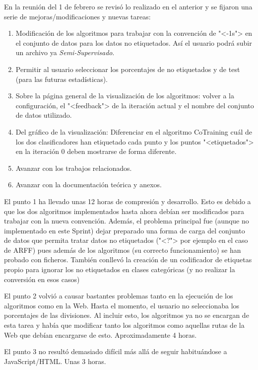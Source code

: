 En la reunión del 1 de febrero se revisó lo realizado en el anterior y se fijaron
una serie de mejoras/modificaciones y nuevas tareas:
\begin{enumerate}
    \item Modificación de los algoritmos para trabajar con la convención de
    "<-1s"> en el conjunto de datos para los datos no etiquetados. Así el
    usuario podrá subir un archivo ya \textit{Semi-Supervisado}.
    \item Permitir al usuario seleccionar los porcentajes de no etiquetados y de
    test (para las futuras estadísticas).
    \item Sobre la página general de la visualización de los algoritmos: volver
    a la configuración, el "<feedback"> de la iteración actual y el nombre del
    conjunto de datos utilizado.
    \item Del gráfico de la visualización: Diferenciar en el algoritmo
    CoTraining cuál de los dos clasificadores han etiquetado cada punto y los
    puntos "<etiquetados"> en la iteración 0 deben mostrarse de forma diferente.
    \item Avanzar con los trabajos relacionados.
    \item Avanzar con la documentación teórica y anexos.
\end{enumerate}

El punto 1 ha llevado unas 12 horas de compresión y desarrollo. Esto es debido a
que los dos algoritmos implementados hasta ahora debían ser modificados para
trabajar con la nueva convención. Además, el problema principal fue (aunque no
implementado en este Sprint) dejar preparado una forma de carga del conjunto de
datos que permita tratar datos no etiquetados ("<?"> por ejemplo en el caso de
ARFF) pues además de los algoritmos (su correcto funcionamiento) se han probado
con ficheros. También conllevó la creación de un codificador de etiquetas propio
para ignorar los no etiquetados en clases categóricas (y no realizar la
conversión en esos casos)

El punto 2 volvió a causar bastantes problemas tanto en la ejecución de los
algoritmos como en la Web. Hasta el momento, el usuario no seleccionaba los
porcentajes de las divisiones. Al incluir esto, los algoritmos ya no se encargan
de esta tarea y había que modificar tanto los algoritmos como aquellas rutas de
la Web que debían encargarse de esto. Aproximadamente 4 horas.

El punto 3 no resultó demasiado difícil más allá de seguir habituándose a
JavaScript/HTML. Unas 3 horas.

